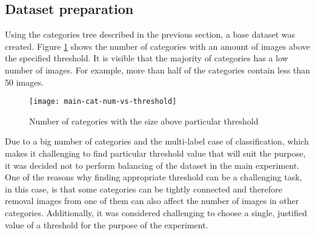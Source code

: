     
    
    
    
    
    
    
    
    
    \subsection{Dataset preparation}
    \label{sec:main-dataset-prep}
    Using the categories tree described in the previous section, a base dataset was created. Figure \ref{fig:main-cat-num-vs-threshold} shows the number of categories with an amount of images above the specified threshold. It is visible that the majority of categories has a low number of images. For example, more than half of the categories contain less than 50 images.
    
    \begin{figure}[h!]
        \centering
        \texttt{[image: main-cat-num-vs-threshold]}
        \caption[Main experiment. Number of categories with the size above particular threshold]{Number of categories with the size above particular threshold}
        \label{fig:main-cat-num-vs-threshold}
    \end{figure}
    
    Due to a big number of categories and the multi-label case of classification, which makes it challenging to find particular threshold value that will suit the purpose, it was decided not to perform balancing of the dataset in the main experiment. One of the reasons why finding appropriate threshold can be a challenging task, in this case, is that some categories can be tightly connected and therefore removal images from one of them can also affect the number of images in other categories. Additionally, it was considered challenging to choose a single, justified value of a threshold for the purpose of the experiment.
    
